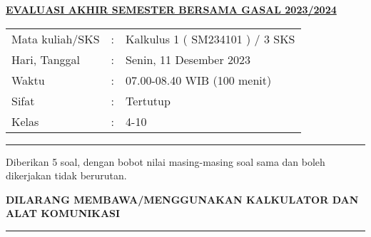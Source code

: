 \documentclass[11pt,openany,a4paper]{article}
\begin{document}
    \begin{center}
	{\underline{\textbf{\MakeUppercase{Evaluasi Akhir Semester Bersama Gasal 2023/2024}}}}
    \end{center}

    \begin{center}
	\begin{tabular}{lcl}
		Mata kuliah/SKS & : & Kalkulus 1 ( SM234101 ) / 3 SKS\\
		Hari, Tanggal & : & Senin, 11 Desember 2023\\
		Waktu & : & 07.00-08.40 WIB (100 menit)\\
		Sifat & : & Tertutup\\
		Kelas & : & 4-10
	\end{tabular}
    \end{center}
	
    \noindent\rule{\textwidth}{2.pt}
	
    \setlength{\parindent}{5pt}
    \par Diberikan 5 soal, dengan bobot nilai masing-masing soal sama dan boleh dikerjakan tidak berurutan.
    \setlength{\parindent}{5pt}
    \setlength{\parindent}{5pt}
    {\small
    \par \textbf{\MakeUppercase{Dilarang membawa/menggunakan kalkulator dan alat komunikasi}}
    }
    \par {}
	
    \noindent\rule{\textwidth}{2.pt}
	
\end{document}
